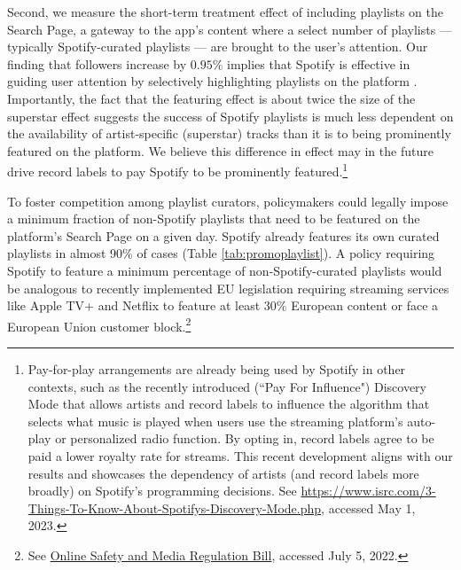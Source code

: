 \documentclass[12pt, a4paper, leqno]{article}
\begin{document}
Second, we measure the short-term treatment effect of including playlists on the Search Page, a gateway to the app’s content where a select number of playlists --- typically Spotify-curated playlists --- are brought to the user's attention. Our finding that followers increase by $0.95\%$ implies that Spotify is effective in guiding user attention by selectively highlighting playlists on the platform \citep[e.g., ][]{goldfarb_tucker_2019}. Importantly, the fact that the featuring effect is about twice the size of the superstar effect suggests the success of Spotify playlists is much less dependent on the availability of artist-specific (superstar) tracks than it is to being prominently featured on the platform. We believe this difference in effect may in the future drive record labels to pay Spotify to be prominently featured.\footnote{Pay-for-play arrangements are already being used by Spotify in other contexts, such as the recently introduced (``Pay For Influence") Discovery Mode that allows artists and record labels to influence the algorithm that selects what music is played when users use the streaming platform's auto-play or personalized radio function. By opting in, record labels agree to be paid a lower royalty rate for streams. This recent development aligns with our results and showcases the dependency of artists (and record labels more broadly) on Spotify's programming decisions. See \href{https://www.isrc.com/3-Things-To-Know-About-Spotifys-Discovery-Mode.php}{https://www.isrc.com/3-Things-To-Know-About-Spotifys-Discovery-Mode.php}, accessed May 1, 2023.}  

To foster competition among playlist curators, policymakers could legally impose a minimum fraction of non-Spotify playlists that need to be featured on the platform's Search Page on a given day. 
Spotify already features its own curated playlists in almost 90\% of cases (Table \ref{tab:promoplaylist}). A policy requiring Spotify to feature a minimum percentage of non-Spotify-curated playlists would be analogous to recently implemented EU legislation requiring streaming services like Apple TV+ and Netflix to feature at least $30\%$ European content or face a European Union customer block.\footnote{See \href{https://www.gov.ie/en/publication/d8e4c-online-safety-and-media-regulation-bill/}{Online Safety and Media Regulation Bill}, accessed July 5, 2022.}
\end{document}
